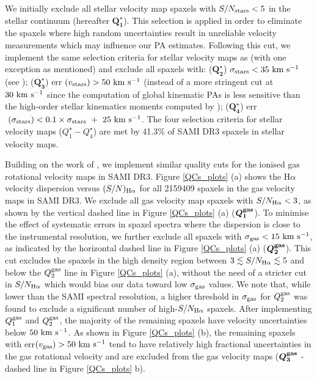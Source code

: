 \documentclass[fleqn,usenatbib]{mnras}
\begin{document}
We initially exclude all stellar velocity map spaxels with $S/N_{\rm{stars}} < 5$ in the stellar continuum (hereafter $\boldsymbol{ {Q_{1}^{\star}} }$). This selection is applied in order to eliminate the spaxels where high random uncertainties result in unreliable velocity measurements which may influence our PA estimates. Following this cut, we implement the same selection criteria for stellar velocity maps as \cite{vds2017} (with one exception as mentioned) and exclude all spaxels with: ($\boldsymbol{Q_{2}^{\star}}$) $\sigma_{\rm{stars}} < 35\ \rm{km\ s^{-1}}$ (see \citealt{Fogarty2015}); ($\boldsymbol{Q_{3}^{\star}}$) err$\ (v_{\rm{stars}}) > 50\ \rm{km\ s^{-1}}$ (instead of a more stringent cut at $30\ \rm{km\ s^{-1}}$ since the computation of global kinematic PAs is less sensitive than the high-order stellar kinematics moments computed by \citealt{vds2017}); ($\boldsymbol{Q_{4}^{\star}}$) err$\ (\sigma_{\rm{stars}})<0.1 \times \sigma_{\rm{stars}}\ +\ 25\ \rm{km\ s^{-1}}$. The four selection criteria for stellar velocity maps ($Q_{1}^{\star}-Q_{4}^{\star}$) are met by 41.3\% of SAMI DR3 spaxels in stellar velocity maps.

Building on the work of \cite{vds2017}, we implement similar quality cuts for the ionised gas rotational velocity maps in SAMI DR3. Figure \ref{QCs_plots} (a) shows the H$\alpha$ velocity dispersion versus $(S/N)_{\rm{H\alpha}}$ for all 2159409 spaxels in the gas velocity maps in SAMI DR3. We exclude all gas velocity map spaxels with $S/N_{\rm{H\alpha}} < 3$, as shown by the vertical dashed line in Figure \ref{QCs_plots} (a) ($\boldsymbol{Q_{1}^{\rm{gas}}}$). To minimise the effect of systematic errors in spaxel spectra where the dispersion is close to the instrumental resolution, we further exclude all spaxels with $\sigma_{\rm{gas}} < 15\ \rm{km\ s^{-1}}$, as indicated by the horizontal dashed line in Figure \ref{QCs_plots} (a) ($\boldsymbol{Q_{2}^{\rm{gas}}}$). This cut excludes the spaxels in the high density region between $3 \lesssim S/N_{\rm{H\alpha}} \lesssim 5$ and below the $Q_{2}^{\rm{gas}}$ line in Figure \ref{QCs_plots} (a), without the need of a stricter cut in  $S/N_{\rm{H\alpha}}$ which would bias our data toward low $\sigma_{\rm{gas}}$ values. We note that, while lower than the SAMI spectral resolution, a higher threshold in $\sigma_{\rm{gas}}$ for $Q_{2}^{\rm{gas}}$ was found to exclude a significant number of high-$S/N_{\rm{H\alpha}}$ spaxels. After implementing $Q_{1}^{\rm{gas}}$ and $Q_{2}^{\rm{gas}}$, the majority of the remaining spaxels have velocity uncertainties below $50\ \rm{km\ s^{-1}}$. As shown in Figure \ref{QCs_plots} (b), the remaining spaxels with err$ (v_{\rm{gas}}) > 50\ \rm{km\ s^{-1}}$ tend to have relatively high fractional uncertainties in the gas rotational velocity and are excluded from the gas velocity maps ($\boldsymbol{Q_{3}^{\rm{gas}}}$ - dashed line in Figure \ref{QCs_plots} b).
\end{document}
